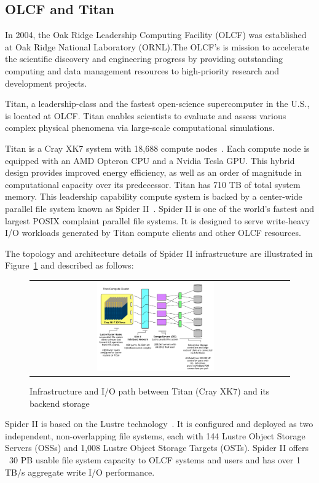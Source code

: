 \subsection{OLCF and Titan}

In 2004, the Oak Ridge Leadership Computing Facility (OLCF) was established at
Oak Ridge National Laboratory (ORNL).The  OLCF's is mission to accelerate the
scientific discovery and engineering progress by providing outstanding
computing and data management resources to high-priority research and
development projects.

Titan, a leadership-class and the fastest open-science supercomputer in the
U.S., is located at OLCF. Titan enables scientists to evaluate and assess various
complex physical phenomena via large-scale computational simulations. 

Titan is a Cray XK7 system with 18,688 compute nodes~\cite{top500}. Each
compute node is equipped with an AMD Opteron CPU and a Nvidia Tesla GPU. This
hybrid design provides improved energy efficiency, as well as an order of
magnitude in computational capacity over its predecessor. Titan has 710 TB of
total system memory. This leadership capability compute system is backed by a
center-wide parallel file system known as Spider II~\cite{spider2}. Spider II
is one of the world's fastest and largest POSIX complaint parallel file
systems. It is designed to serve write-heavy I/O workloads generated by Titan
compute clients and other OLCF resources.


The topology and architecture details of Spider II infrastructure are
illustrated in Figure~\ref{fig:xk7-compute-node} and
described as follows:


\begin{figure}[!htb]
    \centering
    \begin{tabular}{cc}
        {\includegraphics[width=0.48\textwidth]{figures/spider2arch.pdf}}\\
    \end{tabular}
    \caption{Infrastructure and I/O path between Titan (Cray XK7) and its backend storage}
    \label{fig:xk7-compute-node}
\end{figure}



Spider II is based on the Lustre technology~\cite{lustre}.  It is configured
and deployed as two independent, non-overlapping file systems, each with 144
Lustre Object Storage Servers (OSSs) and 1,008 Lustre Object Storage Targets
(OSTs). Spider II offers ~30 PB usable file system capacity to OLCF systems and
users and has over 1 TB/s aggregate write I/O performance.


